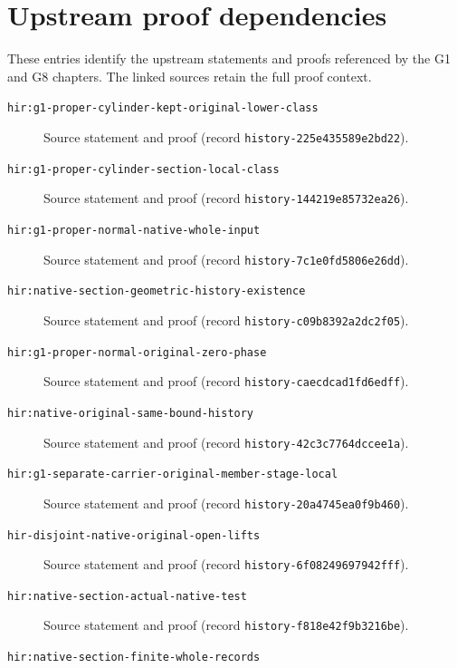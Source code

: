 \section{Upstream proof dependencies}
These entries identify the upstream statements and proofs referenced by the
G1 and G8 chapters. The linked sources retain the full proof context.
\begin{description}
\item[\texttt{hir:g1-proper-cylinder-kept-original-lower-class}]\label{hir:g1-proper-cylinder-kept-original-lower-class}
Source statement and proof (record \texttt{history-225e435589e2bd22}).
\item[\texttt{hir:g1-proper-cylinder-section-local-class}]\label{hir:g1-proper-cylinder-section-local-class}
Source statement and proof (record \texttt{history-144219e85732ea26}).
\item[\texttt{hir:g1-proper-normal-native-whole-input}]\label{hir:g1-proper-normal-native-whole-input}
Source statement and proof (record \texttt{history-7c1e0fd5806e26dd}).
\item[\texttt{hir:native-section-geometric-history-existence}]\label{hir:native-section-geometric-history-existence}
Source statement and proof (record \texttt{history-c09b8392a2dc2f05}).
\item[\texttt{hir:g1-proper-normal-original-zero-phase}]\label{hir:g1-proper-normal-original-zero-phase}
Source statement and proof (record \texttt{history-caecdcad1fd6edff}).
\item[\texttt{hir:native-original-same-bound-history}]\label{hir:native-original-same-bound-history}
Source statement and proof (record \texttt{history-42c3c7764dccee1a}).
\item[\texttt{hir:g1-separate-carrier-original-member-stage-local}]\label{hir:g1-separate-carrier-original-member-stage-local}
Source statement and proof (record \texttt{history-20a4745ea0f9b460}).
\item[\texttt{hir-disjoint-native-original-open-lifts}]\label{hir-disjoint-native-original-open-lifts}
Source statement and proof (record \texttt{history-6f08249697942fff}).
\item[\texttt{hir:native-section-actual-native-test}]\label{hir:native-section-actual-native-test}
Source statement and proof (record \texttt{history-f818e42f9b3216be}).
\item[\texttt{hir:native-section-finite-whole-records}]\label{hir:native-section-finite-whole-records}

\end{description}
